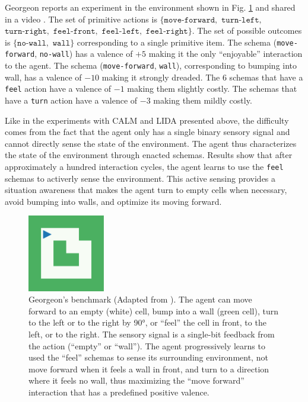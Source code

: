 \documentclass[runningheads]{llncs}
\begin{document}
Georgeon \cite{georgeon_intrinsically-motivated_2012} reports an experiment in the environment shown in Fig. \ref{fig:georgeon} and shared in a video \cite{georgeon_video_2012}.
The set of primitive actions is $\{ \texttt{move-forward},$ $\texttt{turn-left},$ $\texttt{turn-right},$ $\texttt{feel-front},$ $\texttt{feel-left},$ $\texttt{feel-right}\}$.
The set of possible outcomes is $\{ \texttt{no-wall},$ $ \texttt{wall} \}$ corresponding to a single primitive item. 
The schema (\texttt{move-forward}, \texttt{no-wall}) has a valence of $+5$ making it the only ``enjoyable'' interaction to the agent. 
The schema (\texttt{move-forward}, \texttt{wall}), corresponding to bumping into wall, has a valence of $-10$ making it strongly dreaded. 
The 6 schemas that have a \texttt{feel} action have a valence of $-1$ making them slightly costly. 
The schemas that have a \texttt{turn} action  have a valence of $-3$ making them mildly costly. 

Like in the experiments with CALM and LIDA presented above, the difficulty comes from the fact that the agent only has a single binary sensory signal and cannot directly sense the state of the environment. 
The agent thus characterizes the state of the environment through enacted schemas. 
Results show that after approximately a hundred interaction cycles, the agent learns to use the \texttt{feel} schemas to activerly sense the environment. 
This active sensing provides a situation awareness that makes the agent turn to empty cells when necessary, avoid bumping into walls, and optimize its moving forward. 

\begin{figure}
	\centering
	\includegraphics[width=0.3\textwidth]{Figure_grid_plot.pdf}
	\caption{Georgeon's benchmark (Adapted from \cite{georgeon_intrinsically-motivated_2012}).
		The agent can move forward to an empty (white) cell, bump into a wall (green cell), turn to the left or to the right by 90°, or ``feel'' the cell in front, to the left, or to the right. 
		The sensory signal is a single-bit feedback from the action (``empty'' or ``wall''). 	
		The agent progressively learns to used the ``feel'' schemas to sense its surrounding environment, not move forward when it feels a wall in front, and turn to a direction where it feels no wall, thus maximizing the ``move forward'' interaction that has a predefined positive valence.
	} 
	\label{fig:georgeon}
\end{figure}
\end{document}
